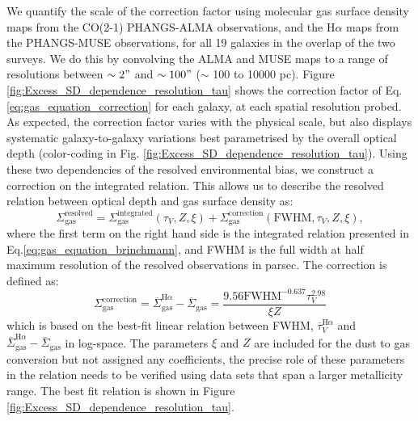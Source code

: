 \documentclass[fleqn,usenatbib]{mnras}
\begin{document}
We quantify the scale of the correction factor using molecular gas surface density maps from the CO(2-1) PHANGS-ALMA observations,  and the H$\alpha$ maps from the PHANGS-MUSE observations, for all 19 galaxies in the overlap of the two surveys. We do this by convolving the ALMA and MUSE maps to a range of resolutions between $\sim2"$ and $\sim100"$ ($\sim$ 100 to 10000 pc). Figure \ref{fig:Excess_SD_dependence_resolution_tau} shows the correction factor of Eq. \ref{eq:gas_equation_correction} for each galaxy, at each spatial resolution probed. As expected, the correction factor varies with the physical scale, but also displays systematic galaxy-to-galaxy variations best parametrised by the overall optical depth (color-coding in Fig. \ref{fig:Excess_SD_dependence_resolution_tau}). 
Using these two dependencies of the resolved environmental bias, we construct a correction on the integrated relation. This allows us to describe the resolved relation between optical depth and gas surface density as:
\begin{equation}
\label{eq:resolved_gas_equation}
    \Sigma_{\textrm{gas}}^{\textrm{resolved}} = \Sigma_{\textrm{gas}}^{\textrm{integrated}}(\tau_{V}, Z, \xi) + \Sigma_{\textrm{gas}}^{\textrm{correction}}(\textrm{FWHM}, \tau_{V}, Z, \xi), 
\end{equation}
where the first term on the right hand side is the integrated relation presented in Eq.\ref{eq:gas_equation_brinchmann}, and FWHM is the full width at half maximum resolution of the resolved observations in parsec. The correction is defined as:
\begin{equation}
\label{eq:gas_equation_correction}
    \Sigma_{\textrm{gas}}^{\textrm{correction}} =
    \overline{\Sigma}_{\textrm{gas}}^{\textrm{H}\alpha} - \overline{\Sigma}_{\textrm{gas}}
    = \frac{9.56\textrm{FWHM}^{-0.637}\tau_{V}^{2.98}}{\xi Z}
\end{equation}
which is based on the best-fit linear relation between FWHM, $\overline{\tau}_{V}^{\textrm{H}\alpha}$ and $\overline{\Sigma}_{\textrm{gas}}^{\textrm{H}\alpha} - \overline{\Sigma}_{\textrm{gas}}$ in log-space. The parameters $\xi$ and $Z$ are included for the dust to gas conversion but not assigned any coefficients, the precise role of these parameters in the relation needs to be verified using data sets that span a larger metallicity range. The best fit relation is shown in Figure \ref{fig:Excess_SD_dependence_resolution_tau}.
\end{document}
